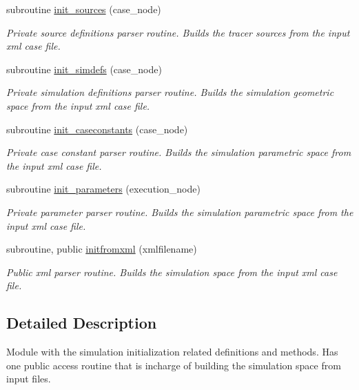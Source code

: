 \begin{DoxyCompactItemize}
subroutine \mbox{\hyperlink{namespacesimulationinitialize__mod_acaa6b217159e3a10e7db04dd7b0e4058}{init\+\_\+sources}} (case\+\_\+node)
\begin{DoxyCompactList}\small\item\em Private source definitions parser routine. Builds the tracer sources from the input xml case file. \end{DoxyCompactList}\item 
subroutine \mbox{\hyperlink{namespacesimulationinitialize__mod_af6b2508d52e9e29aeb6e7dfbabd88e8d}{init\+\_\+simdefs}} (case\+\_\+node)
\begin{DoxyCompactList}\small\item\em Private simulation definitions parser routine. Builds the simulation geometric space from the input xml case file. \end{DoxyCompactList}\item 
subroutine \mbox{\hyperlink{namespacesimulationinitialize__mod_ae41256ca5e72ebf27660ffdfe5c08e46}{init\+\_\+caseconstants}} (case\+\_\+node)
\begin{DoxyCompactList}\small\item\em Private case constant parser routine. Builds the simulation parametric space from the input xml case file. \end{DoxyCompactList}\item 
subroutine \mbox{\hyperlink{namespacesimulationinitialize__mod_a0b32e8c950fc615198d1e47ba1d36cd6}{init\+\_\+parameters}} (execution\+\_\+node)
\begin{DoxyCompactList}\small\item\em Private parameter parser routine. Builds the simulation parametric space from the input xml case file. \end{DoxyCompactList}\item 
subroutine, public \mbox{\hyperlink{namespacesimulationinitialize__mod_ada0310fe0d45fa2eec30deaf3ad25ba7}{initfromxml}} (xmlfilename)
\begin{DoxyCompactList}\small\item\em Public xml parser routine. Builds the simulation space from the input xml case file. \end{DoxyCompactList}\end{DoxyCompactItemize}


\subsection{Detailed Description}
Module with the simulation initialization related definitions and methods. Has one public access routine that is incharge of building the simulation space from input files. 


